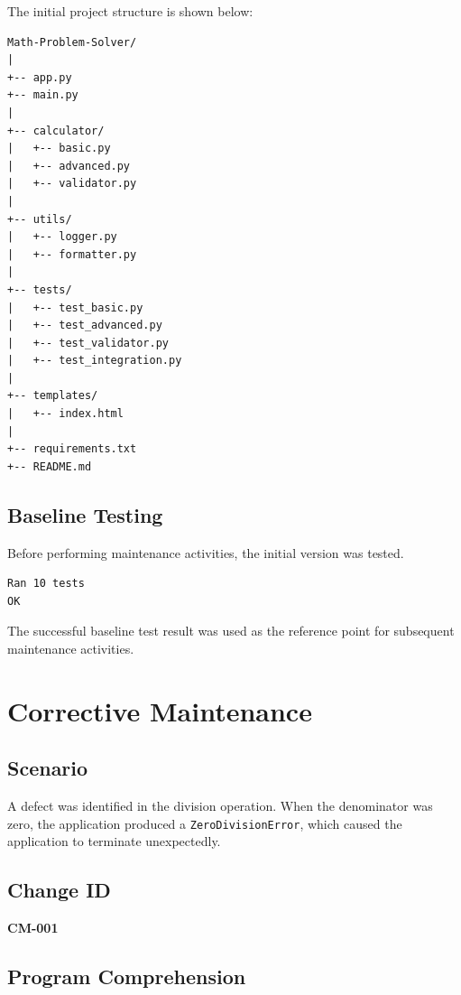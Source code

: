 \documentclass[12pt,a4paper,openany]{report}
\begin{document}
The initial project structure is shown below:

\begin{lstlisting}[language={}]
Math-Problem-Solver/
|
+-- app.py
+-- main.py
|
+-- calculator/
|   +-- basic.py
|   +-- advanced.py
|   +-- validator.py
|
+-- utils/
|   +-- logger.py
|   +-- formatter.py
|
+-- tests/
|   +-- test_basic.py
|   +-- test_advanced.py
|   +-- test_validator.py
|   +-- test_integration.py
|
+-- templates/
|   +-- index.html
|
+-- requirements.txt
+-- README.md
\end{lstlisting}

\section{Baseline Testing}

Before performing maintenance activities, the initial version was
tested.

\begin{verbatim}
Ran 10 tests
OK
\end{verbatim}

The successful baseline test result was used as the reference point
for subsequent maintenance activities.


\chapter{Corrective Maintenance}

\section{Scenario}

A defect was identified in the division operation. When the denominator
was zero, the application produced a \texttt{ZeroDivisionError}, which
caused the application to terminate unexpectedly.

\section{Change ID}

\textbf{CM-001}

\section{Program Comprehension}
\end{document}
